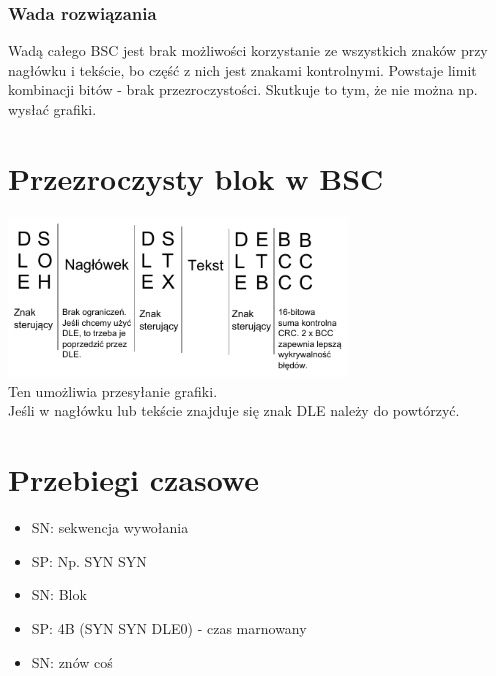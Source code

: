 \documentclass[a4paper,twoside]{article}
\begin{document}
	\subsubsection{Wada rozwiązania}
	Wadą całego BSC jest brak możliwości korzystanie ze wszystkich znaków przy nagłówku i tekście, bo część z nich jest znakami kontrolnymi. Powstaje limit kombinacji bitów - brak przezroczystości. Skutkuje to tym, że nie można np. wysłać grafiki.
\section{Przezroczysty blok w BSC}
\includegraphics[width=9cm]{./images/image11.pdf}\\
Ten umożliwia przesyłanie grafiki.\\
Jeśli w nagłówku lub tekście znajduje się znak DLE należy do powtórzyć.
\section{Przebiegi czasowe}
\begin{itemize}
	\item SN: sekwencja wywołania
	\item SP: Np. SYN SYN
	\item SN: Blok
	\item SP: 4B (SYN SYN DLE0) - czas marnowany
	\item SN: znów coś
\end{itemize}
\end{document}
